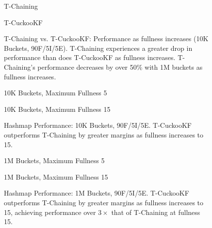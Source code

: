 \begin{figure}[H]
    \centering
    \begin{minipage}{0.70\textwidth}
    \caption*{T-Chaining}
        \vspace{12pt}
    \end{minipage}
    \begin{minipage}{0.70\textwidth}
    \caption*{T-CuckooKF}
    \end{minipage}
    \caption[T-Chaining vs. T-CuckooKF: Performance as fullness increases (1M Buckets, 90F/5I/5E)]{T-Chaining vs. T-CuckooKF: Performance as fullness increases (10K Buckets, 90F/5I/5E). T-Chaining experiences a greater drop in performance than does T-CuckooKF as fullness increases. T-Chaining's performance decreases by over 50\% with 1M buckets as fullness increases.}
    \label{fig:hm_fullness_90_2}
\end{figure}

\begin{figure}[H]
    \centering
    \begin{minipage}{0.75\textwidth}
    \caption*{10K Buckets, Maximum Fullness 5}
        \vspace{12pt}
    \end{minipage}
   \begin{minipage}{0.75\textwidth}
    \caption*{10K Buckets, Maximum Fullness 15}
        \vspace{12pt}
    \end{minipage}
	\caption[Hashmap Performance: 10K Buckets, 90F/5I/5E]{Hashmap Performance: 10K Buckets, 90F/5I/5E. T-CuckooKF outperforms T-Chaining by greater margins as fullness increases to 15.}
    \label{fig:hm_90_1}
\end{figure}

\begin{figure}[H]
    \centering
    \begin{minipage}{0.75\textwidth}
    \caption*{1M Buckets, Maximum Fullness 5}
        \vspace{12pt}
    \end{minipage}
   \begin{minipage}{0.75\textwidth}
    \caption*{1M Buckets, Maximum Fullness 15}
        \vspace{12pt}
    \end{minipage}
	\caption[Hashmap Performance: 1M Buckets, 90F/5I/5E]{Hashmap Performance: 1M Buckets, 90F/5I/5E. T-CuckooKF outperforms T-Chaining by greater margins as fullness increases to 15, achieving performance over $3\times$ that of T-Chaining at fullness 15.}
    \label{fig:hm_90_3}
\end{figure}

